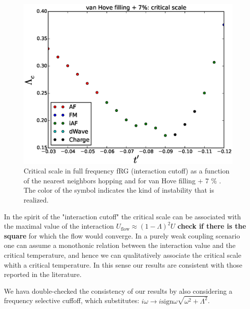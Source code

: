 \begin{figure}
\includegraphics[scale=0.8]{vanHove_plus_scan_critical_lambda_phi.eps}
\caption{Critical scale in full frequency fRG (interaction cutoff) as a function of the nearest neighbors hopping and for van Hove filling + 7 \% . The color of the symbol indicates the kind of instability that is realized.} 
\label{phasediag_van_hove_plus} 
\end{figure}

In the spirit of the "interaction cutoff" the critical scale can be associated with the maximal value of the interaction $U_{\mathrm{flow}}\approx(1-\Lambda)^2 U$ \textbf{check if there is the square} for which the flow would converge. 
In a purely weak coupling scenario one can assume a monothonic relation between the interaction value and the critical temperature, and hence we can qualitatively associate the critical scale whith a critical temperature. In this sense our results are consistent with those reported in the literature. 

We hava double-checked the consistency of our results by also considering a frequency selective cuffoff, which substitutes: $i\omega \rightarrow i\mathrm{sign} \omega \sqrt{\omega^2+\Lambda^2}$. 

